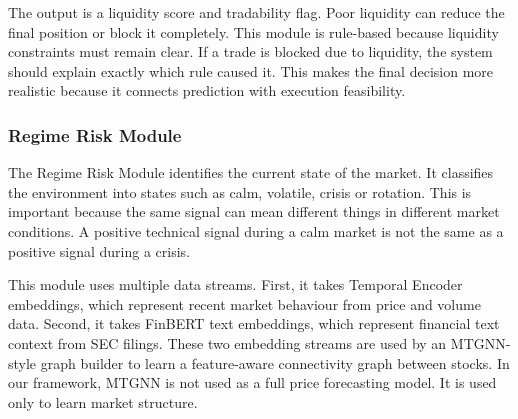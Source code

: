 \documentclass[conference]{IEEEtran}
\begin{document}
The output is a liquidity score and tradability flag. Poor liquidity can reduce the final position or block it completely. This module is rule-based because liquidity constraints must remain clear. If a trade is blocked due to liquidity, the system should explain exactly which rule caused it. This makes the final decision more realistic because it connects prediction with execution feasibility.


\subsubsection{Regime Risk Module}
The Regime Risk Module identifies the current state of the market. It classifies the environment into states such as calm, volatile, crisis or rotation. This is important because the same signal can mean different things in different market conditions. A positive technical signal during a calm market is not the same as a positive signal during a crisis.

This module uses multiple data streams. First, it takes Temporal Encoder embeddings, which represent recent market behaviour from price and volume data. Second, it takes FinBERT text embeddings, which represent financial text context from SEC filings. These two embedding streams are used by an MTGNN-style graph builder\cite{MTGNN} to learn a feature-aware connectivity graph between stocks. In our framework, MTGNN is not used as a full price forecasting model. It is used only to learn market structure.
\end{document}
